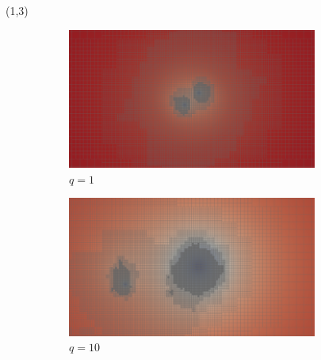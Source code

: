 \documentclass[landscape]{a0poster}
\begin{document}
\begin{textblock}{18}
\begin{textblock}{17}(1,3)
	\begin{figure}
		\begin{subfigure}{0.33\textwidth}
			\includegraphics[width=0.9\textwidth]{figs/img_slice_level_r1.png}
			\caption{\large $q=1$}
		\end{subfigure}
		\begin{subfigure}{0.33\textwidth}
			\includegraphics[width=0.9\textwidth]{figs/img_slice_level_r10.png}
			\caption{\large $q=10$}
		\end{subfigure}
		\begin{subfigure}{0.33\textwidth}

\end{subfigure}
\end{figure}
\end{textblock}
\end{textblock}
\end{document}
